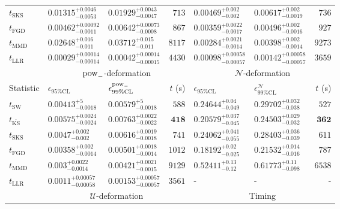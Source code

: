 \begin{tabular}{l|llr|llr}
	$t_{\mathrm{SKS}}$ & $0.01315_{-0.0053}^{+0.0046}$ & $0.01929_{-0.0047}^{+0.0043}$ & $713$ & $0.00469_{-0.002}^{+0.002}$ & $0.00617_{-0.0019}^{+0.002}$ & $736$ \\
	$t_{\mathrm{FGD}}$ & ${\mathbf{0.00462_{-0.0011}^{+0.00092}}}$ & ${\mathbf{0.00642_{-0.0008}^{+0.00073}}}$ & $867$ & $0.00359_{-0.0017}^{+0.0022}$ & $0.00496_{-0.0016}^{+0.002}$ & $927$ \\
	$t_{\mathrm{MMD}}$ & $0.02648_{-0.011}^{+0.016}$ & $0.03712_{-0.011}^{+0.015}$ & $8117$ & ${\mathbf{0.00284_{-0.0014}^{+0.0021}}}$ & ${\mathbf{0.00398_{-0.0014}^{+0.002}}}$ & $9273$ \\
	$t_{\mathrm{LLR}}$ & $0.00029_{-0.00014}^{+0.00014}$ & $0.00042_{-0.00015}^{+0.00014}$ & $4430$ & $0.00098_{-0.00057}^{+0.00058}$ & $0.00142_{-0.00057}^{+0.00058}$ & $3659$ \\
	\toprule
	\multicolumn{1}{c}{} & \multicolumn{3}{c}{$\rm{pow}_{-}$-deformation} & \multicolumn{3}{c}{$\mathcal{N}$-deformation} \\
	Statistic & $\epsilon_{95\%\mathrm{CL}}$ & $\epsilon^  {\rm{pow}_{-}}_{99\%\mathrm{CL}}$ & $t$ (s) & $\epsilon_{95\%\mathrm{CL}}$ & $\epsilon^    {\mathcal{N}}_{99\%\mathrm{CL}}$ & $t$ (s) \\
	\midrule
	$t_{\mathrm{SW}}$ & $0.00413_{-0.0018}^{+5}$ & $0.00579_{-0.0018}^{+5}$ & $588$ & $0.24644_{-0.049}^{+0.04}$ & $0.29702_{-0.038}^{+0.032}$ & $527$ \\
	$t_{\overline{\mathrm{KS}}}$ & $0.00575_{-0.0024}^{+0.0024}$ & $0.00763_{-0.0022}^{+0.0022}$ & ${\mathbf{418}}$ & $0.20579_{-0.045}^{+0.037}$ & $0.24503_{-0.032}^{+0.029}$ & ${\mathbf{362}}$ \\
	$t_{\mathrm{SKS}}$ & $0.0047_{-0.002}^{+0.002}$ & $0.00616_{-0.0018}^{+0.0019}$ & $741$ & $0.24062_{-0.055}^{+0.041}$ & $0.28403_{-0.039}^{+0.036}$ & $611$ \\
	$t_{\mathrm{FGD}}$ & $0.00358_{-0.0014}^{+0.002}$ & $0.00501_{-0.0014}^{+0.0018}$ & $1012$ & ${\mathbf{0.18192_{-0.025}^{+0.02}}}$ & ${\mathbf{0.21532_{-0.016}^{+0.014}}}$ & $787$ \\
	$t_{\mathrm{MMD}}$ & ${\mathbf{0.003_{-0.0014}^{+0.0022}}}$ & ${\mathbf{0.00421_{-0.0015}^{+0.0021}}}$ & $9129$ & $0.52411_{-0.12}^{+0.13}$ & $0.61773_{-0.098}^{+0.11}$ & $6538$ \\
	$t_{\mathrm{LLR}}$ & $0.0011_{-0.00058}^{+0.00057}$ & $0.00153_{-0.00057}^{+0.00057}$ & $3561$ & - & - & - \\
	\toprule
	\multicolumn{1}{c}{} & \multicolumn{3}{c}{$\mathcal{U}$-deformation} & \multicolumn{3}{c}{Timing} \\

\end{tabular}
